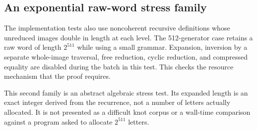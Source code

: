 \subsection{An exponential raw-word stress family}

The implementation tests also use noncoherent recursive definitions whose
unreduced images double in length at each level. The 512-generator case
retains a raw word of length $2^{511}$ while using a small grammar.
Expansion, inversion by a separate whole-image traversal, free reduction,
cyclic reduction, and compressed equality are disabled during the batch in
this test. This checks the resource mechanism that the proof requires.

This second family is an abstract algebraic stress test. Its expanded length
is an exact integer derived from the recurrence, not a number of letters
actually allocated. It is not presented as a difficult knot corpus or a
wall-time comparison against a program asked to allocate $2^{511}$ letters.
